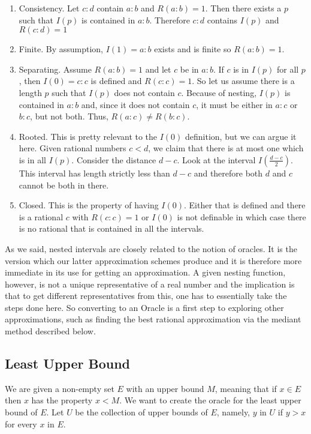 \documentclass[12pt]{article}
\theoremstyle{remark}
\begin{document}
\begin{enumerate}
    \item Consistency. Let $c:d$ contain $a:b$ and $R(a:b)=1$. Then there exists a $p$ such that $I(p)$ is contained in $a:b$. Therefore $c:d$ contains $I(p)$ and $R(c:d) = 1$
    \item Finite. By assumption, $I(1)=a:b$ exists and is finite so $R(a:b)=1$.
    \item Separating. Assume $R(a:b)=1$ and let $c$ be in $a:b$. If $c$ is in $I(p)$ for all $p$, then $I(0) = c:c$ is defined and $R(c:c)=1$. So let us assume there is a length $p$ such that $I(p)$ does not contain $c$. Because of nesting, $I(p)$ is contained in $a:b$ and, since it does not contain $c$, it must be either in $a:c$ or $b:c$, but not both. Thus, $R(a:c) \neq R(b:c)$.
    \item Rooted. This is pretty relevant to the $I(0)$ definition, but we can argue it here. Given rational numbers $c < d$, we claim that there is at most one which is in all $I(p)$. Consider the distance $d-c$. Look at the interval $I( \tfrac{d-c}{2} )$. This interval has length strictly less than $d-c$ and therefore both $d$ and $c$ cannot be both in there. 
    \item Closed. This is the property of having $I(0)$. Either that is defined and there is a rational $c$ with $R(c:c)=1$ or $I(0)$ is not definable in which case there is no rational that is contained in all the intervals. 
\end{enumerate}

As we said, nested intervals are closely related to the notion of oracles. It is the version which our latter approximation schemes produce and it is therefore more immediate in its use for getting an approximation. A given nesting function, however, is not a unique representative of a real number and the implication is that to get different representatives from this, one has to essentially take the steps done here. So converting to an Oracle is a first step to exploring other approximations, such as finding the best rational approximation via the mediant method described below. 

\subsection{Least Upper Bound}

We are given a non-empty set $E$ with an upper bound $M$, meaning that if $x \in E$ then $x$ has the property $x < M$. We want to create the oracle for the least upper bound of $E$. Let $U$ be the collection of upper bounds of $E$, namely, $y$ in $U$ if $y > x$ for every $x$ in $E$. 
\end{document}
